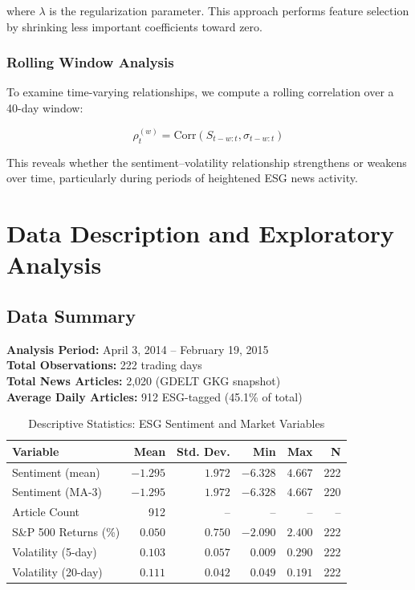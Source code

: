\documentclass[12pt,a4paper]{article}
\begin{document}
where $\lambda$ is the regularization parameter. This approach performs feature selection by shrinking less important coefficients toward zero.

\subsubsection{Rolling Window Analysis}
\label{subsubsec:rolling}

To examine time-varying relationships, we compute a rolling correlation over a 40-day window:

\begin{equation}
    \rho_t^{(w)} = \text{Corr}(S_{t-w:t}, \sigma_{t-w:t})
    \label{eq:rolling}
\end{equation}

This reveals whether the sentiment--volatility relationship strengthens or weakens over time, particularly during periods of heightened ESG news activity.


\section{Data Description and Exploratory Analysis}
\label{sec:data}

\subsection{Data Summary}
\label{subsec:data-summary}

\textbf{Analysis Period:} April 3, 2014 -- February 19, 2015 \\
\textbf{Total Observations:} 222 trading days \\
\textbf{Total News Articles:} 2,020 (GDELT GKG snapshot) \\
\textbf{Average Daily Articles:} 912 ESG-tagged (45.1\% of total)

\begin{table}[H]
    \centering
    \caption{Descriptive Statistics: ESG Sentiment and Market Variables}
    \label{tab:descriptive}
    \begin{tabular}{lrrrrr}
        \toprule
        \textbf{Variable} & \textbf{Mean} & \textbf{Std. Dev.} & \textbf{Min} & \textbf{Max} & \textbf{N} \\
        \midrule
        Sentiment (mean) & $-1.295$ & $1.972$ & $-6.328$ & $4.667$ & 222 \\
        Sentiment (MA-3) & $-1.295$ & $1.972$ & $-6.328$ & $4.667$ & 220 \\
        Article Count & 912 & -- & -- & -- & -- \\
        \midrule
        S\&P 500 Returns (\%) & $0.050$ & $0.750$ & $-2.090$ & $2.400$ & 222 \\
        Volatility (5-day) & $0.103$ & $0.057$ & $0.009$ & $0.290$ & 222 \\
        Volatility (20-day) & $0.111$ & $0.042$ & $0.049$ & $0.191$ & 222 \\
        \bottomrule
    \end{tabular}
\end{table}
\end{document}
